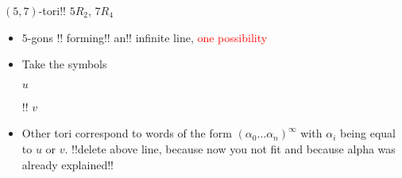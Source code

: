 \documentclass[%
pdf,
colorBG,
slideColor,
]{prosper}
\begin{document}
\begin{slide}{$(5,7)$-tori!! $5R_2$, $7R_4$}
\begin{itemize}
\item $5$-gons 
!!%
forming!! an!! infinite line, \textcolor{red}{one possibility}
\begin{center}
\par
\end{center}
\item Take the symbols
\begin{center}
\begin{minipage}{5.2cm}
\centering
{}\par
$u$
\end{minipage}
\begin{minipage}{5.2cm}
\centering
{}\par
!!%
$v$
\end{minipage}
\end{center}
\item Other tori correspond to words of the form 
$(\alpha_0\dots\alpha_n)^{\infty}$ 
with $\alpha_i$ being equal to $u$ or $v$.
!!delete above line, because now you not fit and because alpha was already
explained!!


\end{itemize}
\end{slide}
\end{document}
